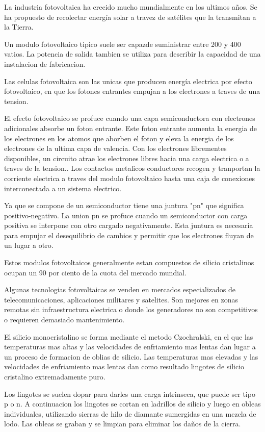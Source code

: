 \documentclass[runningheads]{llncs}
\begin{document}
La industria fotovoltaica ha crecido mucho mundialmente en los ultimos años. Se ha propuesto de recolectar energía solar a travez de satélites que la transmitan a la Tierra.

Un modulo fotovoltaico tipico suele ser capazde suministrar entre 200 y 400 vatios. La potencia de salida tambien se utiliza para describir la capacidad de una instalacion de fabricacion.

Las celulas fotovoltaica son las unicas que producen energía electrica por efecto fotovoltaico, en que los fotones entrantes empujan a los electrones a traves de una tension.

El efecto fotovoltaico se profuce cuando una capa semiconductora con electrones adicionales absorbe un foton entrante. Este foton entrante aumenta la energia de los electrones en los atomos que aborben el foton y eleva la energia de los electrones de la ultima capa de valencia. Con los electrones librementes disponibles, un circuito atrae los electrones libres hacia una carga electrica o a traves de la tension.. Los contactos metalicos conductores recogen y tranportan la corriente electrica a traves del modulo fotovoltaico hasta una caja de conexiones interconectada a un sistema electrico.

Ya que se compone de un semiconductor tiene una juntura "pn" que significa positivo-negativo. La union pn se profuce cuando un semiconductor con carga positiva se interpone con otro cargado negativamente. Esta juntura es necesaria para empujar el desequilibrio de cambios y permitir que los electrones fluyan de un lugar a otro.

Estos modulos fotovoltaicos generalmente estan compuestos de silicio cristalinos ocupan un 90 por ciento de la cuota del mercado mundial.

Algunas tecnologias fotovoltaicas se venden en  mercados especializados de telecomunicaciones, aplicaciones militares y satelites. Son mejores en zonas remotas sin infraestructura electrica o donde los generadores no son competitivos o requieren demasiado mantenimiento. 

El silicio monocristalino se forma mediante el metodo Czochralski, en el que las temperaturas mas altas y las velocidades de enfriamiento mas lentas dan lugar a un proceso de formacion de oblias de silicio. Las temperaturas mas elevadas y las velocidades de enfriamiento mas lentas dan como resultado lingotes de silicio cristalino extremadamente puro.

Los lingotes se suelen dopar para darles una carga intrinseca, que puede ser tipo p o n.
A continuacion los lingotes se cortan en ladrillos de silicio y luego en obleas individuales, utilizando sierras de hilo de diamante sumergidas en una mezcla de lodo. Las obleas se graban y se limpian para eliminar los daños de la cierra.
\end{document}
